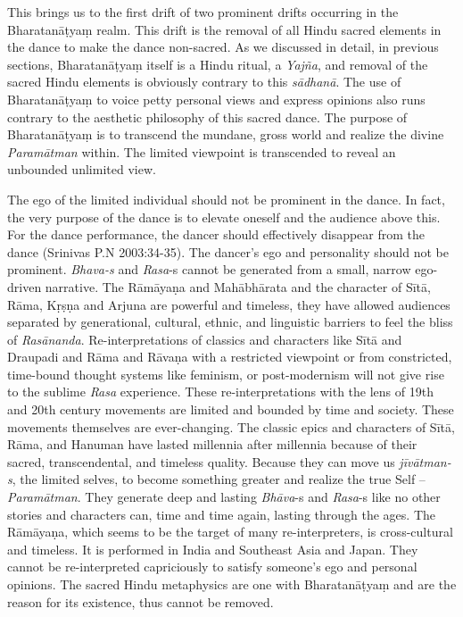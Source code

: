 This brings us to the first drift of two prominent drifts occurring in the Bharatanāṭyaṃ realm. This drift is the removal of all Hindu sacred elements in the dance to make the dance non-sacred. As we discussed in detail, in previous sections, Bharatanāṭyaṃ itself is a Hindu ritual, a \textit{Yajña}, and removal of the sacred Hindu elements is obviously contrary to this \textit{sādhanā}. The use of Bharatanāṭyaṃ to voice petty personal views and express opinions also runs contrary to the aesthetic philosophy of this sacred dance. The purpose of Bharatanāṭyaṃ is to transcend the mundane, gross world and realize the divine \textit{Paramātman} within. The limited viewpoint is transcended to reveal an unbounded unlimited view.

The ego of the limited individual should not be prominent in the dance. In fact, the very purpose of the dance is to elevate oneself and the audience above this. For the dance performance, the dancer should effectively disappear from the dance (Srinivas P.N 2003:34-35). The dancer’s ego and personality should not be prominent. \textit{Bhava-s} and \textit{Rasa}-s cannot be generated from a small, narrow ego-driven narrative. The Rāmāyaṇa and Mahābhārata and the character of Sītā, Rāma, Kṛṣṇa and Arjuna are powerful and timeless, they have allowed audiences separated by generational, cultural, ethnic, and linguistic barriers to feel the bliss of \textit{Rasānanda}. Re-interpretations of classics and characters like Sītā and Draupadi and Rāma and Rāvaṇa with a restricted viewpoint or from constricted, time-bound thought systems like feminism, or post-modernism will not give rise to the sublime \textit{Rasa} experience. These re-interpretations with the lens of 19th and 20th century movements are limited and bounded by time and society. These movements themselves are ever-changing. The classic epics and characters of Sītā, Rāma, and Hanuman have lasted millennia after millennia because of their sacred, transcendental, and timeless quality. Because they can move us \textit{jīvātman-s}, the limited selves, to become something greater and realize the true Self – \textit{Paramātman}. They generate deep and lasting \textit{Bhāva}-s and \textit{Rasa}-s like no other stories and characters can, time and time again, lasting through the ages. The Rāmāyaṇa, which seems to be the target of many re-interpreters, is cross-cultural and timeless. It is performed in India and Southeast Asia and Japan. They cannot be re-interpreted capriciously to satisfy someone’s ego and personal opinions. The sacred Hindu metaphysics are one with Bharatanāṭyaṃ and are the reason for its existence, thus cannot be removed.

